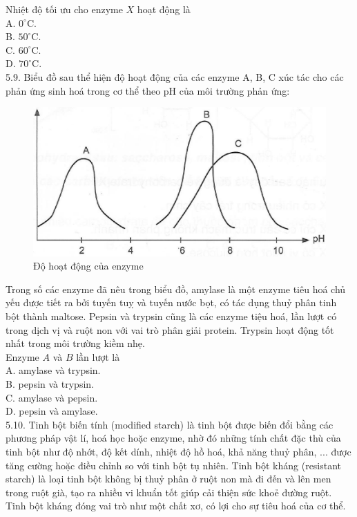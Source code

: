 \documentclass[10pt]{article}
\begin{document}
Nhiệt độ tối ưu cho enzyme $X$ hoạt động là\\
A. $0^{\circ} \mathrm{C}$.\\
B. $50^{\circ} \mathrm{C}$.\\
C. $60^{\circ} \mathrm{C}$.\\
D. $70^{\circ} \mathrm{C}$.\\
5.9. Biểu đồ sau thể hiện độ hoạt động của các enzyme A, B, C xúc tác cho các phản ứng sinh hoá trong cơ thể theo pH của môi trường phản ứng:

\begin{figure}[h]
\begin{center}
\captionsetup{labelformat=empty}
\caption{Độ hoạt động của enzyme}
  \includegraphics[width=\textwidth]{2025_10_23_de6f5713836e4e91b3c8g-032}
\end{center}
\end{figure}

Trong số các enzyme đã nêu trong biểu đồ, amylase là một enzyme tiêu hoá chủ yếu được tiết ra bởi tuyến tuỵ và tuyến nước bọt, có tác dụng thuỷ phân tinh bột thành maltose. Pepsin và trypsin cũng là các enzyme tiệu hoá, lần lượt có trong dịch vị và ruột non với vai trò phân giải protein. Trypsin hoạt động tốt nhất trong môi trường kiềm nhẹ.\\
Enzyme $A$ và $B$ lần lượt là\\
A. amylase và trypsin.\\
B. pepsin và trypsin.\\
C. amylase và pepsin.\\
D. pepsin và amylase.\\
5.10. Tinh bột biến tính (modified starch) là tinh bột được biến đổi bằng các phương pháp vật lí, hoá học hoặc enzyme, nhờ đó những tính chất đặc thù của tinh bột như độ nhớt, độ kết dính, nhiệt độ hồ hoá, khả năng thuỷ phân, ... được tăng cường hoặc điều chỉnh so với tinh bột tụ nhiên. Tinh bột kháng (resistant starch) là loại tinh bột không bị thuỷ phân ở ruột non mà đi đến và lên men trong ruột già, tạo ra nhiều vi khuẩn tốt giúp cải thiện sức khoẻ đường ruột. Tinh bột kháng đóng vai trò như một chất xơ, có lợi cho sự tiêu hoá của cơ thể.
\end{document}
